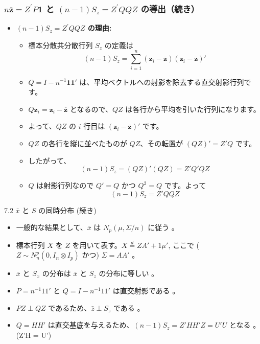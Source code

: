 \documentclass[aspectratio=169]{beamer}
\begin{document}
\begin{frame}
\frametitle{$n\overline{\bm{z}}=Z^{\prime}P\bm{1}$ と $(n-1)S_z=Z^{\prime}QQZ$ の導出（続き）}
\begin{itemize}
    \item \textbf{$(n-1)S_z=Z^{\prime}QQZ$ の理由:}
    \begin{itemize}
        \item 標本分散共分散行列 $S_z$ の定義は
        \[
        (n-1)S_z = \sum_{i=1}^{n} (\bm{z}_i - \overline{\bm{z}})(\bm{z}_i - \overline{\bm{z}})'
        \]
        \item $Q = I - n^{-1}\bm{1}\bm{1}'$ は、平均ベクトルへの射影を除去する直交射影行列です。
        \item $Q\bm{z}_i = \bm{z}_i - \overline{\bm{z}}$ となるので、$QZ$ は各行から平均を引いた行列になります。
        \item よって、$QZ$ の $i$ 行目は $(\bm{z}_i - \overline{\bm{z}})'$ です。
        \item $QZ$ の各行を縦に並べたものが $QZ$、その転置が $(QZ)' = Z'Q$ です。
        \item したがって、
        \[
        (n-1)S_z = (QZ)'(QZ) = Z'Q'QZ
        \]
        \item $Q$ は射影行列なので $Q' = Q$ かつ $Q^2 = Q$ です。よって
        \[
        (n-1)S_z = Z'QQZ
        \]
    \end{itemize}
\end{itemize}
\end{frame}

\begin{frame}{7.2 $\bar{x}$ と $S$ の同時分布 (続き)}
\begin{itemize}
    \item 一般的な結果として、$\bar{x}$ は $N_p(\mu, \Sigma/n)$ に従う 。
    \item 標本行列 $X$ を $Z$ を用いて表す。$X \overset{d}{=} ZA' + 1\mu'$, ここで ($Z \sim N_n^p(0, I_n \otimes I_p)$ かつ) $\Sigma=AA'$ 。
    \item $\bar{x}$ と $S_x$ の分布は $\bar{x}$ と $S_z$ の分布に等しい 。
    \item $P=n^{-1}11'$ と $Q=I-n^{-1}11'$ は直交射影である 。
    \item $PZ \perp QZ$ であるため、$\bar{z} \perp S_z$ である 。
    \item $Q=HH'$ は直交基底を与えるため、$(n-1)S_z = Z'HH'Z = U'U$ となる 。\\
    (Z'H = U')
\end{itemize}
\end{frame}
\end{document}

